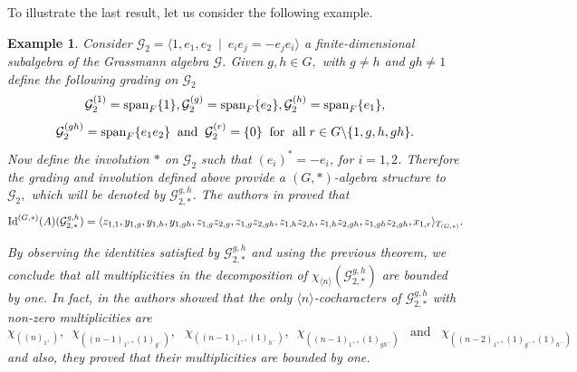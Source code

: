 \documentclass{amsart}
\newcommand{\IdG}{\ensuremath{\textnormal{Id}^{(G,\ast)}}}
\newcommand{\blue}{\color{blue}}
\newcommand{\spam}{\ensuremath{\textnormal{span}}}
\newtheorem{exemplo}[teorema]{Example}
\numberwithin{equation}{section}
\begin{document}
To illustrate the last result, let us consider  the following example.  
	 \begin{exemplo} Consider 
	$\mathcal{G}_2=\langle 1, e_1, e_2~ \mid ~ e_ie_j=-e_je_i\rangle$ a finite-dimensional subalgebra of the Grassmann algebra $\mathcal{G}$.	
	Given $g, h\in G,$ with $g\neq h$ and $gh\neq 1$ define the following grading on $\mathcal{G}_2$  $$\mathcal{G}_2^{(1)}=\spam_F\{1\}, \mathcal{G}_2^{(g)}=\spam_F\{e_2\},  \mathcal{G}_2^{(h)}=\spam_F\{e_1\}, $$
$$\mathcal{G}_2^{(gh)}=\spam_F\{e_1e_2\} \;\;\mbox{and}\;\;
\mathcal{G}_2^{(r)}=\{0\} \;\; \mbox{for\; all}\; r \in G\backslash \{1, g, h, gh\}.$$
	Now define the involution $*$ on $\mathcal{G}_2$ such that 
	$(e_i)^*=-e_i$, for $i=1,2$. Therefore the grading and involution defined above provide a $(G,*)$-algebra structure to $\mathcal{G}_2,$ which will be denoted by $\mathcal{G}_{2,*}^{g,h}$.
	      The authors in \cite{CSV} proved that
	$$\IdG(A)(\mathcal{G}_{2,*}^{g,h})=\langle z_{1,1}, y_{1,g}, y_{1,h}, y_{1,gh}, z_{1,g}z_{2,g}, z_{1,g}z_{2,gh}, z_{1,h}z_{2,h},z_{1,h}z_{2,gh}, z_{1,gh}z_{2,gh}, x_{1,r}\rangle_{T_{(G,*)}}.$$

By observing the identities satisfied by $\mathcal{G}_{2,*}^{g,h}$ and using the previous theorem, we conclude that all multiplicities in the  decomposition of $\chi_{\langle n\rangle}(\mathcal{G}_{2,*}^{g,h})$ are bounded by one.
In fact, in \cite{CSV} the authors showed that the only $\langle n \rangle$-cocharacters of $\mathcal{G}_{2,*}^{g,h}$ with non-zero multiplicities are 
$$\chi_{((n)_{1^+})},\,\,\, \chi_{((n-1)_{1^+}, (1)_{g^-})}, \,\,\,\,\chi_{((n-1)_{1^+},(1)_{h^-})},\,\,\, \chi_{((n-1)_{1^+}, (1)_{gh^-} )}\,\,\, \mbox{ and } \,\,\, \chi_{((n-2)_{1^+}, (1)_{g^-}, (1)_{h^-})}$$
and also, they proved that their multiplicities are bounded by one.

\end{exemplo} 
    
\end{document}
